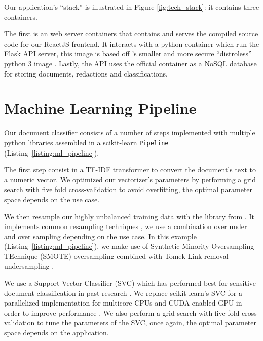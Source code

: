 \documentclass[\version]{l4proj}
\begin{document}

Our application's ``stack'' is illustrated in Figure \ref{fig:tech_stack}: it contains three containers.

The first is an \textcite{NGINX2020} web server containers that contains and serves the compiled source code for our ReactJS frontend.
It interacts with a python container which run the Flask API server, this image is based off \textcite{GoogleContainerToolsDistroless2020}'s smaller and more secure ``distroless'' python 3 image \autocite{mooreDistrolessDockerContainerizing2017}.
Lastly, the API uses the official \textcite{MongoDB2020} container as a NoSQL database for storing documents, redactions and classifications.

\section{Machine Learning Pipeline}

Our document classifier consists of a number of steps implemented with multiple python libraries assembled in a scikit-learn \verb|Pipeline| (Listing~\ref{listing:ml_pipeline}).

The first step consist in a TF-IDF transformer to convert the document's text to a numeric vector.
We optimized our vectorizer's parameters by performing a grid search with five fold cross-validation to avoid overfitting, the optimal parameter space depends on the use case.

We then resample our highly unbalanced training data with the \textcite{ScikitlearncontribImbalancedlearn2020} library from \textcite{lemaitreImbalancedlearnPythonToolbox2017}.
It implements common resampling techniques \autocite{lemaitreImbalancedlearnPythonToolbox2017}, we use a combination over under and over sampling depending on the use case.
In this example (Listing~\ref{listing:ml_pipeline}), we make use of Synthetic Minority Oversampling TEchnique (SMOTE) oversampling combined with Tomek Link removal undersampling \autocite{batistaStudyBehaviorSeveral2004}.

We use a Support Vector Classifier (SVC) which has performed best for sensitive document classification in past research \autocite{mcdonaldClassifierDigitalSensitivity2014,mcdonaldStudySVMKernel2017}.
We replace scikit-learn's SVC for a parallelized implementation for multicore CPUs and CUDA enabled GPU in order to improve performance \autocite{wenThunderSVMFastSVM2018}.
We also perform a grid search with five fold cross-validation to tune the parameters of the SVC, once again, the optimal parameter space depends on the application.
\end{document}
